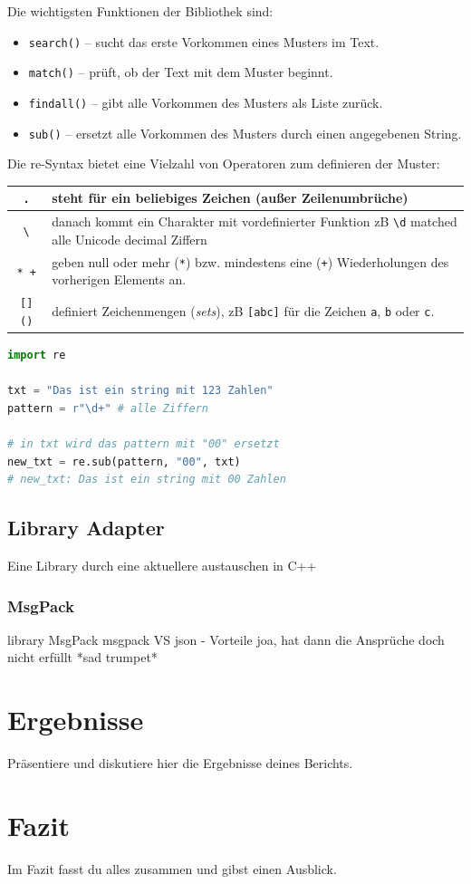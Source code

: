 \documentclass[a4paper, 12pt]{article}
\begin{document}
Die wichtigsten Funktionen der Bibliothek sind:
\begin{itemize}
    \item \texttt{search()} – sucht das erste Vorkommen eines Musters im Text.
    \item \texttt{match()} – prüft, ob der Text mit dem Muster beginnt.
    \item \texttt{findall()} – gibt alle Vorkommen des Musters als Liste zurück.
    \item \texttt{sub()} – ersetzt alle Vorkommen des Musters durch einen angegebenen String.
\end{itemize}

\newpage
Die re-Syntax bietet eine Vielzahl von Operatoren zum definieren der Muster:
\begin{table}[h!]
\centering
\begin{tabular}{|c | >{\arraybackslash}p{11cm}|}
\hline
\texttt{.} & steht für ein beliebiges Zeichen (außer Zeilenumbrüche) \\
\hline
\texttt{\textbackslash} & danach kommt ein Charakter mit vordefinierter Funktion zB \texttt{\textbackslash d}  matched
	alle Unicode decimal Ziffern \\
\hline
\texttt{* +} & geben null oder mehr (\texttt{*}) bzw. mindestens 
	eine (\texttt{+}) Wiederholungen des vorherigen Elements an. \\
\hline
\texttt{[] ()} & definiert Zeichenmengen (\textit{sets}), zB \texttt{[abc]} für die Zeichen 	 
	\texttt{a}, \texttt{b} oder \texttt{c}. \\
\hline
\end{tabular}
\end{table}

\begin{lstlisting}[language=Python, caption=Beispiel für Python-Code]
import re

txt = "Das ist ein string mit 123 Zahlen"
pattern = r"\d+" # alle Ziffern

# in txt wird das pattern mit "00" ersetzt
new_txt = re.sub(pattern, "00", txt)
# new_txt: Das ist ein string mit 00 Zahlen
\end{lstlisting} %

\subsection{Library Adapter}\label{LibraryAdapter}
Eine Library durch eine aktuellere austauschen in C++

\subsubsection{MsgPack}\label{msgpack}
library MsgPack
msgpack VS json - Vorteile
joa, hat dann die Ansprüche doch nicht erfüllt *sad trumpet*

\newpage
\section{Ergebnisse}
Präsentiere und diskutiere hier die Ergebnisse deines Berichts.

\newpage
\section{Fazit}
Im Fazit fasst du alles zusammen und gibst einen Ausblick.

\newpage


\end{document}
